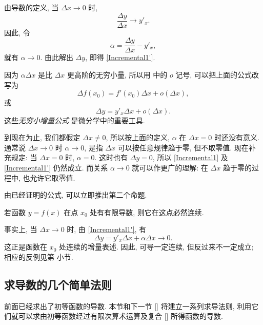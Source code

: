由导数的定义, 当 $\Delta x\to0$ 时,
$$
\frac{\Delta y}{\Delta x}\to y'_x.
$$
因此, 令
$$
\alpha=\frac{\Delta y}{\Delta x}-y'_x,
$$
就有 $\alpha\to0$.
由此解出 $\Delta y$, 即得 \eqref{Incremental1'}.

因为 $\alpha\Delta x$ 是比 $\Delta x$ 更高阶的无穷小量,
所以用  中的 $o$ 记号, 可以把上面的公式改写为
\begin{equation}\label{Incremental2}
\Delta f(x_0)=f'(x_0)\Delta x+o(\Delta x),
\end{equation}
或
\begin{equation}\tag{\theequation a}\label{Incremental2'}
\Delta y=y'_x\Delta x+o(\Delta x).
\end{equation}
这些\emph{无穷小增量公式}
是微分学中的重要工具.

\begin{remark}\label{note:increment_parameter_at_zero}
到现在为止, 我们都假定 $\Delta x\neq0$,
所以按上面的定义, $\alpha$ 在 $\Delta x=0$ 时还没有意义.
通常说 $\Delta x\to0$ 时 $\alpha\to0$, 是指 $\Delta x$ 可以按任意规律趋于零,
但不取零值.
现在补充规定: 当 $\Delta x=0$ 时, $\alpha=0$.
这时也有 $\Delta y=0$, 所以 \eqref{Incremental1}
及 \eqref{Incremental1'} 仍然成立.
而关系 $\alpha\to0$ 就可以作更广的理解:
在 $\Delta x$ 趋于零的过程中, 也允许它取零值.
\end{remark}

由已经证明的公式, 可以立即推出第二个命题.

\myrefparagraph{2\textdegree}\label{prop:differentiability_implies_continuity}
{\kaishu 若函数 $y=f(x)$ 在点 $x_0$ 处有有限导数,
则它在这点必然连续.}

事实上, 当 $\Delta x\to0$ 时, 由 \eqref{Incremental1'}, 有
$$
\Delta y=y'_x\Delta x+\alpha\Delta x\to0.
$$
这正是函数在 $x_0$ 处连续的增量表述.
因此, 可导一定连续, 但反过来不一定成立; 相应的反例见第  小节.

\subsection{求导数的几个简单法则}\label{subsec:97}
\begingroup
\setlength{\abovedisplayskip}{6pt plus 2pt minus 2pt}
\setlength{\belowdisplayskip}{6pt plus 2pt minus 2pt}
\setlength{\abovedisplayshortskip}{3pt plus 2pt}
\setlength{\belowdisplayshortskip}{6pt plus 2pt minus 2pt}
前面已经求出了初等函数的导数.
本节和下一节 [] 将建立一系列求导法则, 利用它们就可以求由初等函数经过有限次算术运算及复合
[] 所得函数的导数.

